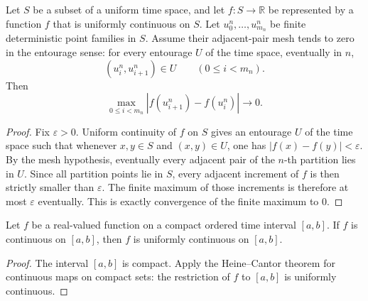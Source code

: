 \begin{lemma}\label{lem:UniformContinuousOn.finite_partition_sup_nnnorm_sub_tendsto_zero}
Let \(S\) be a subset of a uniform time space, and let \(f:S\to\mathbb R\)
be represented by a function \(f\) that is uniformly continuous on \(S\).
Let \(u^n_0,\ldots,u^n_{m_n}\) be finite deterministic point families in
\(S\).  Assume their adjacent-pair mesh tends to zero in the entourage sense:
for every entourage \(U\) of the time space, eventually in \(n\),
\[
  (u^n_i,u^n_{i+1})\in U
  \qquad (0\le i<m_n).
\]
Then
\[
  \max_{0\le i<m_n}|f(u^n_{i+1})-f(u^n_i)| \longrightarrow 0 .
\]
\end{lemma}

\begin{proof}
Fix \(\varepsilon>0\).  Uniform continuity of \(f\) on \(S\) gives an
entourage \(U\) of the time space such that whenever \(x,y\in S\) and
\((x,y)\in U\), one has \(|f(x)-f(y)|<\varepsilon\).  By the mesh hypothesis,
eventually every adjacent pair of the \(n\)-th partition lies in \(U\).  Since
all partition points lie in \(S\), every adjacent increment of \(f\) is then
strictly smaller than \(\varepsilon\).  The finite maximum of those increments
is therefore at most \(\varepsilon\) eventually.  This is exactly convergence
of the finite maximum to \(0\).
\end{proof}

\begin{lemma}\label{lem:ContinuousOn.uniformContinuousOn_Icc}
Let \(f\) be a real-valued function on a compact ordered time interval
\([a,b]\).  If \(f\) is continuous on \([a,b]\), then \(f\) is uniformly
continuous on \([a,b]\).
\end{lemma}

\begin{proof}
The interval \([a,b]\) is compact.  Apply the Heine--Cantor theorem for
continuous maps on compact sets: the restriction of \(f\) to \([a,b]\) is
uniformly continuous.
\end{proof}

